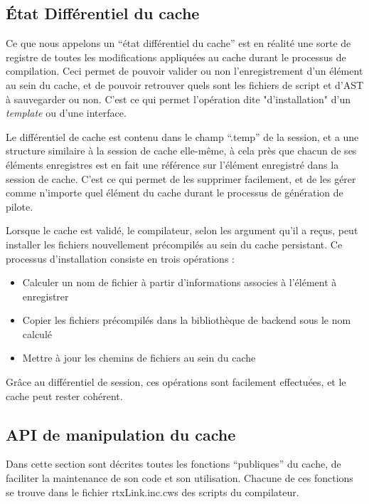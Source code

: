 \documentclass[french]{rtxreport}
\begin{document}
\subsection{État Différentiel du cache}

Ce que nous appelons un ``état différentiel du cache'' est en réalité une sorte
de registre de toutes les modifications appliquées au cache durant le processus
de compilation. Ceci permet de pouvoir valider ou non l'enregistrement d'un
élément au sein du cache, et de pouvoir retrouver quels sont les fichiers de
script et d'AST à sauvegarder ou non. C'est ce qui permet l'opération dite
"d'installation" d'un \emph{template} ou d'une interface.

Le différentiel de cache est contenu dans le champ ``.temp'' de la session, et
a une structure similaire à la session de cache elle-même, à cela près que chacun
de ses éléments enregistres est en fait une référence sur l'élément
enregistré dans la session de cache. C'est ce qui permet de les supprimer
facilement, et de les gérer comme n'importe quel élément du cache durant le
processus de génération de pilote.

Lorsque le cache est validé, le compilateur, selon les argument qu'il a reçus,
peut installer les fichiers nouvellement précompilés au sein du cache
persistant. Ce processus d'installation consiste en trois opérations :
\begin{itemize}
    \item Calculer un nom de fichier à partir d'informations associes à
        l'élément à enregistrer
    \item Copier les fichiers précompilés dans la bibliothèque de backend sous
        le nom calculé
    \item Mettre à jour les chemins de fichiers au sein du cache
\end{itemize}

Grâce au différentiel de session, ces opérations sont facilement effectuées, et
le cache peut rester cohérent.


\subsection{API de manipulation du cache}

Dans cette section sont décrites toutes les fonctions ``publiques'' du cache,
de faciliter la maintenance de son code et son utilisation.  Chacune de ces
fonctions se trouve dans le fichier rtxLink.inc.cws des scripts du compilateur.
\end{document}
